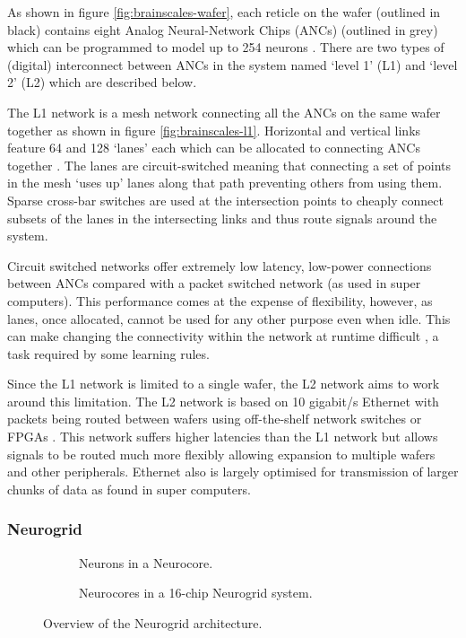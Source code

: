 				As shown in figure \ref{fig:brainscales-wafer}, each reticle on the
				wafer (outlined in black) contains eight Analog Neural-Network Chips
				(ANCs) (outlined in grey) which can be programmed to model up to 254
				neurons \cite{schemmel10}. There are two types of (digital) interconnect
				between ANCs in the system named `level 1' (L1) and `level 2' (L2) which
				are described below.
			
				The L1 network is a mesh network connecting all the ANCs on the same
				wafer together as shown in figure \ref{fig:brainscales-l1}. Horizontal
				and vertical links feature 64 and 128 `lanes' each which can be
				allocated to connecting ANCs together \cite{fieres08}. The lanes are
				circuit-switched meaning that connecting a set of points in the mesh
				`uses up' lanes along that path preventing others from using them.
				Sparse cross-bar switches are used at the intersection points to cheaply
				connect subsets of the lanes in the intersecting links and thus route
				signals around the system.
				
				Circuit switched networks offer extremely low latency, low-power
				connections between ANCs compared with a packet switched network (as
				used in super computers). This performance comes at the expense of
				flexibility, however, as lanes, once allocated, cannot be used for any
				other purpose even when idle. This can make changing the connectivity
				within the network at runtime difficult \cite{dally04}, a task required
				by some learning rules.
				
				Since the L1 network is limited to a single wafer, the L2 network aims
				to work around this limitation. The L2 network is based on 10 gigabit/s
				Ethernet with packets being routed between wafers using off-the-shelf
				network switches or FPGAs \cite{schemmel10}. This network suffers higher
				latencies than the L1 network but allows signals to be routed much more
				flexibly allowing expansion to multiple wafers and other peripherals.
				Ethernet also is largely optimised for transmission of larger chunks of
				data as found in super computers.
			
			\subsubsection{Neurogrid}
				
				\begin{figure}
					\begin{subfigure}[b]{0.39\textwidth}
						\center
						
						\caption{Neurons in a Neurocore.}
						\label{fig:neurogrid-chip}
					\end{subfigure}
					\begin{subfigure}[b]{0.59\textwidth}
						\center
						
						\caption{Neurocores in a 16-chip Neurogrid system.}
						\label{fig:neurogrid-topology}
					\end{subfigure}
					
					\caption{Overview of the Neurogrid architecture.}
					\label{fig:neurogrid-arch-overview}
				\end{figure}
				
